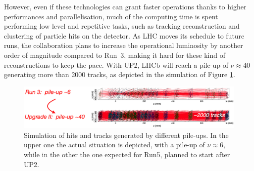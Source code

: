 

However, even if these technologies can grant faster operations thanks to higher performances and parallelisation, much of the computing time is spent performing low level and repetitive tasks, such as tracking reconstruction and clustering of particle hits on the detector. As LHC moves its schedule to future runs, the collaboration plans to increase the operational luminosity by another order of magnitude compared to Run~3, making it hard for these kind of reconstructions to keep the pace. With UP2, LHCb will reach a pile-up of $\nu\approx 40$ generating more than 2000 tracks, as depicted in the simulation of Figure \ref{fig:velo_pile-up}. 

\begin{figure}
    \centering
    \includegraphics[width=\textwidth]{figures/VELO_pile-up.png}
    \caption{Simulation of hits and tracks generated by different pile-ups. In the upper one the actual situation is depicted, with a pile-up of $\nu\approx 6$, while in the other the one expected for Run5, planned to start after UP2.}
    \label{fig:velo_pile-up}
\end{figure}

